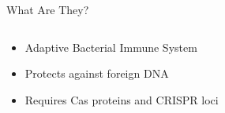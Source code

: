 \documentclass[dvipsnames]{beamer}
\begin{document}
\begin{frame}[fragile]{What Are They?}
    \begin{columns}
    \begin{column}{0.5\textwidth}
        \begin{itemize}
            \item<2-> Adaptive Bacterial Immune System
            \item<3-> Protects against foreign DNA
            \item<4-> Requires Cas proteins and CRISPR loci
        \end{itemize}
    \end{column}
    \begin{column}{0.5\textwidth}
        \begin{figure}[htb!]
            \autocite{crispgen}
        \end{figure}
    \end{column}
    \end{columns}
\end{frame}
\end{document}

